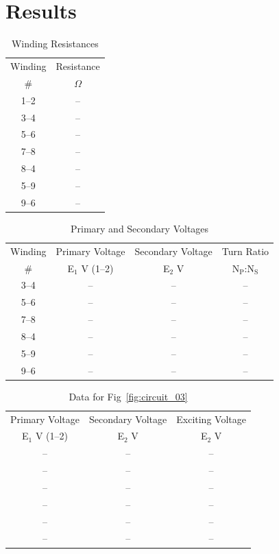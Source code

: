 \documentclass{article}
\begin{document}
\section{Results}
\begin{table}[h]
  \centering
  \begin{tabular}{cc}
    \hline
    Winding & Resistance \\
    \# & $\Omega$ \\
    \hline
    1--2 & -- \\
    3--4 & -- \\
    5--6 & -- \\
    7--8 & -- \\
    8--4 & -- \\
    5--9 & -- \\
    9--6 & -- \\
  \end{tabular}
  \caption{Winding Resistances}
  \label{tab:wind_res}
\end{table}

\begin{table}[h]
  \centering
  \begin{tabular}{cccc}
    \hline
    Winding & Primary Voltage & Secondary Voltage & Turn Ratio \\
    \# & E$_1$ V (1--2) & E$_2$ V & N$_\text{P}$:N$_\text{S}$\\
    \hline
    3--4 & -- & -- & -- \\
    5--6 & -- & -- & -- \\
    7--8 & -- & -- & -- \\
    8--4 & -- & -- & -- \\
    5--9 & -- & -- & -- \\
    9--6 & -- & -- & -- \\
  \end{tabular}
  \caption{Primary and Secondary Voltages}
  \label{tab:volt_rat}
\end{table}

\begin{table}[h]
  \centering
  \begin{tabular}{ccc}
    \hline
    Primary Voltage & Secondary Voltage & Exciting Voltage\\
    E$_1$ V (1--2) & E$_2$ V & E$_2$ V\\
    \hline
    --  & -- & -- \\
    --  & -- & -- \\
    --  & -- & -- \\
    --  & -- & -- \\
    --  & -- & -- \\
    --  & -- & -- \\
  \end{tabular}
  \caption{Data for Fig~\ref{fig:circuit_03}}
  \label{tab:circuit_3}
\end{table}
\end{document}
